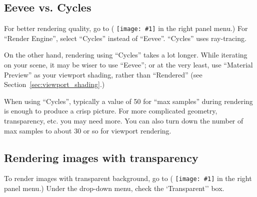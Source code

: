 \documentclass[10pt]{article}
\DeclareRobustCommand{\inlinepic}[1]{%
  \begingroup\normalfont
  \texttt{[image: \#1]}%
  \endgroup
}
\begin{document}
\subsection{Eevee vs. Cycles}
\label{subsec:eevee_vs_cycles}
For better rendering quality, go to  (\inlinepic{images/2022-06-17_render-properties-icon.png} in the right panel menu.) For ``Render Engine'', select ``Cycles'' instead of ``Eevee''. ``Cycles'' uses ray-tracing.

On the other hand, rendering using ``Cycles'' takes a lot longer. While iterating on your scene, it may be wiser to use ``Eevee''; or at the very least, use ``Material Preview'' as your viewport shading, rather than ``Rendered'' (see Section~\ref{sec:viewport_shading}.)

When using ``Cycles'', typically a value of 50 for ``max samples'' during rendering is enough to produce a crisp picture. For more complicated geometry, transparency, etc. you may need more. You can also turn down the number of max samples to about 30 or so for viewport rendering.

\subsection{Rendering images with transparency}
To render images with transparent background, go to  (\inlinepic{images/2022-06-17_render-properties-icon.png} in the right panel menu.) Under the  drop-down menu, check the `Transparent'' box.
\end{document}

